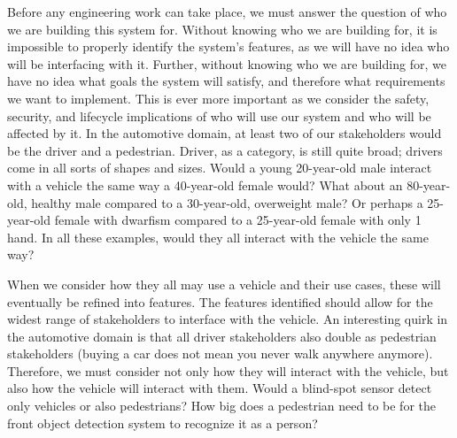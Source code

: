 Before any engineering work can take place, we must answer the question of who we are building this system for. Without knowing who we are building for, it is impossible to properly identify the system's features, as we will have no idea who will be interfacing with it. Further, without knowing who we are building for, we have no idea what goals the system will satisfy, and therefore what requirements we want to implement. This is ever more important as we consider the safety, security, and lifecycle implications of who will use our system and who will be affected by it. In the automotive domain, at least two of our stakeholders would be the driver and a pedestrian. Driver, as a category, is still quite broad; drivers come in all sorts of shapes and sizes. Would a young 20-year-old male interact with a vehicle the same way a 40-year-old female would? What about an 80-year-old, healthy male compared to a 30-year-old, overweight male? Or perhaps a 25-year-old female with dwarfism compared to a 25-year-old female with only 1 hand. In all these examples, would they all interact with the vehicle the same way? 

When we consider how they all may use a vehicle and their use cases, these will eventually be refined into features. The features identified should allow for the widest range of stakeholders to interface with the vehicle. An interesting quirk in the automotive domain is that all driver stakeholders also double as pedestrian stakeholders (buying a car does not mean you never walk anywhere anymore). Therefore, we must consider not only how they will interact with the vehicle, but also how the vehicle will interact with them. Would a blind-spot sensor detect only vehicles or also pedestrians? How big does a pedestrian need to be for the front object detection system to recognize it as a person? 

